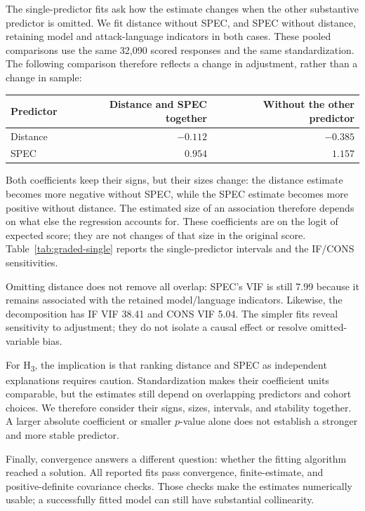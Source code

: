 The single-predictor fits ask how the estimate changes when the other substantive predictor is omitted. We fit distance without SPEC, and SPEC without distance, retaining model and attack-language indicators in both cases. These pooled comparisons use the same 32,090 scored responses and the same standardization. The following comparison therefore reflects a change in adjustment, rather than a change in sample:

\begin{center}
\small
\begin{tabular}{lrr}
\toprule
Predictor & Distance and SPEC together & Without the other predictor \\
\midrule
Distance & $-0.112$ & $-0.385$ \\
SPEC & $0.954$ & $1.157$ \\
\bottomrule
\end{tabular}
\end{center}

Both coefficients keep their signs, but their sizes change: the distance estimate becomes more negative without SPEC, while the SPEC estimate becomes more positive without distance. The estimated size of an association therefore depends on what else the regression accounts for. These coefficients are on the logit of expected score; they are not changes of that size in the original score. Table~\ref{tab:graded-single} reports the single-predictor intervals and the IF/CONS sensitivities.

Omitting distance does not remove all overlap: SPEC's VIF is still 7.99 because it remains associated with the retained model/language indicators. Likewise, the decomposition has IF VIF 38.41 and CONS VIF 5.04. The simpler fits reveal sensitivity to adjustment; they do not isolate a causal effect or resolve omitted-variable bias.

For H\textsubscript{3}, the implication is that ranking distance and SPEC as independent explanations requires caution. Standardization makes their coefficient units comparable, but the estimates still depend on overlapping predictors and cohort choices. We therefore consider their signs, sizes, intervals, and stability together. A larger absolute coefficient or smaller $p$-value alone does not establish a stronger and more stable predictor.

Finally, convergence answers a different question: whether the fitting algorithm reached a solution. All reported fits pass convergence, finite-estimate, and positive-definite covariance checks. Those checks make the estimates numerically usable; a successfully fitted model can still have substantial collinearity.
